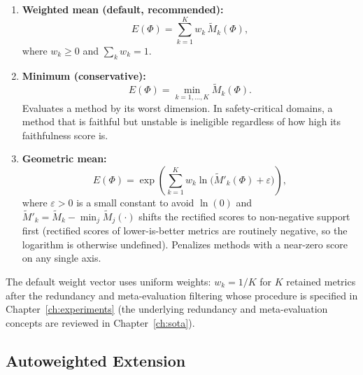 \begin{enumerate}
    \item \textbf{Weighted mean (default, recommended):}
    \begin{equation}
        E(\Phi) = \sum_{k=1}^{K} w_k \, \tilde{M}_k(\Phi),
    \end{equation}
    where $w_k \geq 0$ and $\sum_k w_k = 1$.

    \item \textbf{Minimum (conservative):}
    \begin{equation}
        E(\Phi) = \min_{k=1,\dots,K} \tilde{M}_k(\Phi).
    \end{equation}
    Evaluates a method by its worst dimension. In safety-critical domains, a
    method that is faithful but unstable is ineligible regardless of how high
    its faithfulness score is.

    \item \textbf{Geometric mean:}
    \begin{equation}
        E(\Phi) = \exp\!\left(\sum_{k=1}^{K} w_k \ln\bigl(\tilde{M}'_k(\Phi) + \varepsilon\bigr)\right),
    \end{equation}
    where $\varepsilon > 0$ is a small constant to avoid $\ln(0)$ and
    $\tilde{M}'_k = \tilde{M}_k - \min_j \tilde{M}_j(\cdot)$ shifts the
    rectified scores to non-negative support first (rectified scores of
    lower-is-better metrics are routinely negative, so the logarithm is
    otherwise undefined). Penalizes
    methods with a near-zero score on any single axis.
\end{enumerate}

The default weight vector uses uniform weights: $w_k = 1/K$ for $K$
retained metrics after the redundancy and meta-evaluation filtering whose
procedure is specified in Chapter~\ref{ch:experiments} (the underlying
redundancy and meta-evaluation concepts are reviewed in
Chapter~\ref{ch:sota}).

\subsection{Autoweighted Extension}
\label{sec:weighting}

